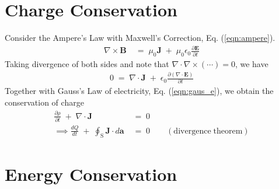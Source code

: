 \documentclass[12pt,a4paper]{article}
\begin{document}
\clearpage


\section{Charge Conservation}
Consider the Ampere's Law with Maxwell's Correction, Eq. (\ref{eqn:ampere}).
\begin{align}
	\nabla \times \mathbf{B} \; &= \; \mu_{0} \mathbf{J} \; + \; \mu_{0} \epsilon_{0} \frac{\partial \mathbf{E}}{\partial t}
\end{align}
Taking divergence of both sides and note that $\nabla \cdot \nabla \times (\cdots) = 0$, we have
\begin{align}
	0 \; = \; \nabla \cdot \mathbf{J} \; + \; \epsilon_{0} \frac{\partial (\nabla \cdot \mathbf{E})}{\partial t}
\end{align}
Together with Gauss's Law of electricity, Eq. (\ref{eqn:gaus_e}), we obtain the conservation of charge
\begin{align}
	\frac{\partial \rho}{\partial t} \; + \; \nabla \cdot \mathbf{J} \; &= \; 0 \\
	\implies \frac{dQ}{dt} \; + \; \oint_{\mathrm{S}} \mathbf{J} \cdot d\mathbf{a} \; &= \; 0
		\qquad \mathrm{(divergence \; theorem)} 
\end{align}



\section{Energy Conservation}
\end{document}
